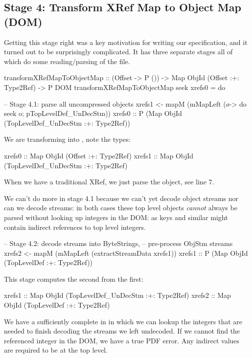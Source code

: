 
\subsection{Stage 4: Transform XRef Map to Object Map (DOM)}

Getting this stage right was a key motivation for writing our
specification, and it turned out to be surprisingly complicated.  It has
three separate stages all of which do some reading/parsing of the file.

\begin{code}
transformXRefMapToObjectMap
  :: (Offset -> P ()) -> Map ObjId (Offset :+: Type2Ref) -> P DOM
transformXRefMapToObjectMap seek xrefs0 = do

    -- Stage 4.1: parse all uncompressed objects
    xrefs1 <- mapM
                (mMapLeft (\o-> do {seek o; pTopLevelDef_UnDecStm}))
                xrefs0
              :: P (Map ObjId (TopLevelDef_UnDecStm :+: Type2Ref))
\end{code}

We are transforming  into , note the types:
\begin{codeNoExecute}
  xrefs0 :: Map ObjId (Offset               :+: Type2Ref) 
  xrefs1 :: Map ObjId (TopLevelDef_UnDecStm :+: Type2Ref)
\end{codeNoExecute}
When we have a traditional XRef, we just parse the object, see line 7.

We can't do more in stage 4.1 because we can't yet decode
object streams nor can we decode streams: in both cases these top
level objects \emph{cannot} always be parsed without looking up
integers in the DOM: as  keys and similar might contain
indirect references to top level integers.

\begin{code}
    -- Stage 4.2: decode streams into ByteStrings,
    --            pre-process ObjStm streams
    xrefs2 <- mapM
                (mMapLeft (extractStreamData xrefs1))
                xrefs1
              :: P (Map ObjId (TopLevelDef :+: Type2Ref))
\end{code}
This stage computes the second from the first:
\begin{codeNoExecute}
  xrefs1 :: Map ObjId (TopLevelDef_UnDecStm :+: Type2Ref)
  xrefs2 :: Map ObjId (TopLevelDef          :+: Type2Ref) 
\end{codeNoExecute}
We have a sufficiently complete  in  in which
we can lookup the integers that are needed to finish decoding the
streams we left undecoded.
If we cannot find the referenced integer in the DOM, we have a true PDF
error.  Any indirect  values are required to be at the
top level.

